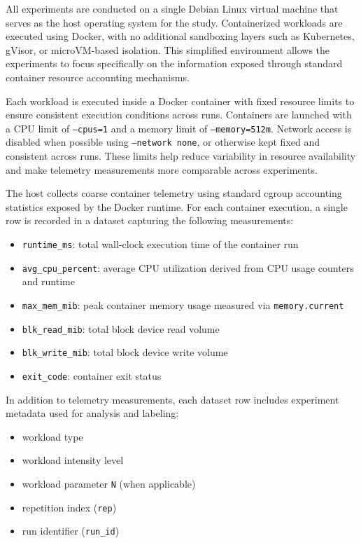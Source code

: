 \documentclass[11pt]{article}
\begin{document}
All experiments are conducted on a single Debian Linux virtual machine that serves as the host operating system for the study. Containerized workloads are executed using Docker, with no additional sandboxing layers such as Kubernetes, gVisor, or microVM-based isolation. This simplified environment allows the experiments to focus specifically on the information exposed through standard container resource accounting mechanisms.

Each workload is executed inside a Docker container with fixed resource limits to ensure consistent execution conditions across runs. Containers are launched with a CPU limit of \texttt{--cpus=1} and a memory limit of \texttt{--memory=512m}. Network access is disabled when possible using \texttt{--network none}, or otherwise kept fixed and consistent across runs. These limits help reduce variability in resource availability and make telemetry measurements more comparable across experiments.

The host collects coarse container telemetry using standard cgroup accounting statistics exposed by the Docker runtime. For each container execution, a single row is recorded in a dataset capturing the following measurements:

\begin{itemize}
    \item \texttt{runtime\_ms}: total wall-clock execution time of the container run
    \item \texttt{avg\_cpu\_percent}: average CPU utilization derived from CPU usage counters and runtime
    \item \texttt{max\_mem\_mib}: peak container memory usage measured via \texttt{memory.current}
    \item \texttt{blk\_read\_mib}: total block device read volume
    \item \texttt{blk\_write\_mib}: total block device write volume
    \item \texttt{exit\_code}: container exit status
\end{itemize}

In addition to telemetry measurements, each dataset row includes experiment metadata used for analysis and labeling:

\begin{itemize}
    \item workload type
    \item workload intensity level
    \item workload parameter \texttt{N} (when applicable)
    \item repetition index (\texttt{rep})
    \item run identifier (\texttt{run\_id})
\end{itemize}
\end{document}
